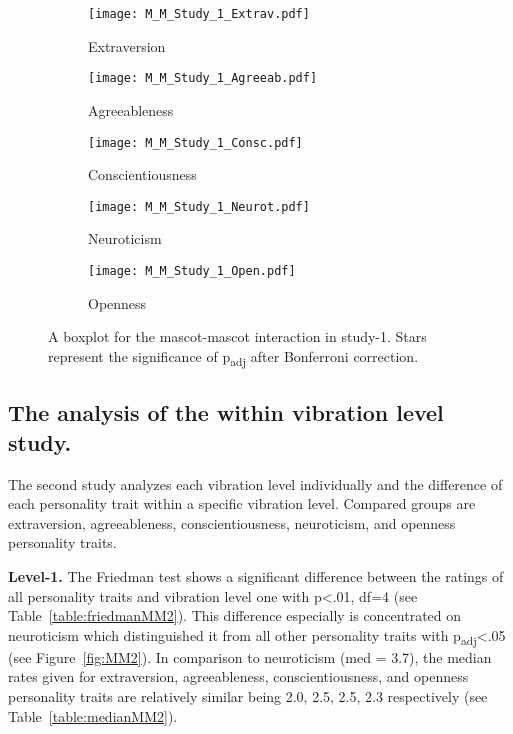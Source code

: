 \begin{figure}[hbt!]
    \centering
    \begin{subfigure}{.45\textwidth}
        \centering
        \texttt{[image: M\_M\_Study\_1\_Extrav.pdf]}
        \caption{Extraversion}
        \label{fig:sub1}
    \end{subfigure}\hfill%
    \begin{subfigure}{.45\textwidth}
        \centering
        \texttt{[image: M\_M\_Study\_1\_Agreeab.pdf]}
        \caption{Agreeableness}
        \label{fig:sub2}
    \end{subfigure}\hfill
    \begin{subfigure}{.45\textwidth}
        \centering
        \texttt{[image: M\_M\_Study\_1\_Consc.pdf]}
        \caption{Conscientiousness}
        \label{fig:sub1}
    \end{subfigure}\hfill%
    \begin{subfigure}{.45\textwidth}
        \centering
        \texttt{[image: M\_M\_Study\_1\_Neurot.pdf]}
        \caption{Neuroticism}
        \label{fig:sub1}
    \end{subfigure}\hfill%
    \begin{subfigure}{.45\textwidth}
        \centering
        \texttt{[image: M\_M\_Study\_1\_Open.pdf]}
        \caption{Openness}
        \label{fig:sub1}
    \end{subfigure}\hfill%
    \caption{A boxplot for the mascot-mascot interaction in study-1.
    Stars represent the significance of p\textsubscript{adj} after Bonferroni correction.}
    \label{fig:MM1}
\end{figure}
\subsection{The analysis of the within vibration level study.}
\label{subsec:MMstudy2}
The second study analyzes each vibration level individually and the difference
of each personality trait within a specific vibration level.
Compared groups are extraversion, agreeableness, conscientiousness, neuroticism, and openness personality traits.

\par\textbf{Level-1.}
The Friedman test shows a significant difference between the ratings of all personality traits
and vibration level one with p<.01, df=4 (see Table~\ref{table:friedmanMM2}).
This difference especially is concentrated on neuroticism which distinguished it from all
other personality traits with p\textsubscript{adj}<.05 (see Figure~\ref{fig:MM2}).
In comparison to neuroticism (med = 3.7), the median rates given for extraversion,
agreeableness, conscientiousness, and openness personality traits are relatively similar
being 2.0, 2.5, 2.5, 2.3 respectively (see Table~\ref{table:medianMM2}).

